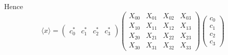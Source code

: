 \documentclass[12pt]{article}
\begin{document}
\noindent
Hence
\begin{equation*}
\langle x\rangle=
\begin{pmatrix}c_0^* & c_1^* & c_2^* & c_3^*\end{pmatrix}
\begin{pmatrix}
X_{00} & X_{01} & X_{02} & X_{03}\\
X_{10} & X_{11} & X_{12} & X_{13}\\
X_{20} & X_{21} & X_{22} & X_{23}\\
X_{30} & X_{31} & X_{32} & X_{33}
\end{pmatrix}
\begin{pmatrix}c_0\\ c_1\\ c_2\\ c_3\end{pmatrix}
\end{equation*}
\end{document}
